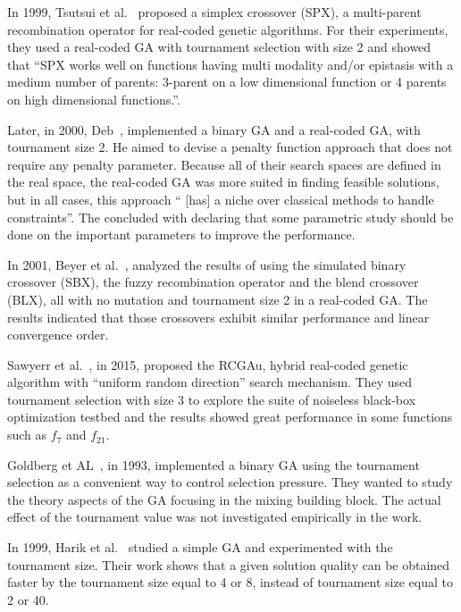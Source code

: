 In 1999, Tsutsui et al.~\cite{tsutsui1999multi} proposed a simplex crossover (SPX), a multi-parent recombination operator for real-coded genetic algorithms. For their experiments, they used a real-coded GA with tournament selection with size 2 and showed that ``SPX works well on functions having multi modality and/or epistasis with a medium number of parents: 3-parent on a low dimensional function or 4 parents on high dimensional functions.''. 

Later, in 2000, Deb~\cite{deb2000efficient}, implemented a binary GA and a real-coded GA, with tournament size 2. He aimed to devise a penalty function approach that does not require any penalty parameter. Because all of their search spaces are defined in the real space, the real-coded GA was more suited in finding feasible solutions, but in all cases, this approach `` [has] a niche over classical methods to handle constraints''. The concluded with declaring that some parametric study should be done on the important parameters to improve the performance.



In 2001, Beyer et al.~\cite{beyer2001self}, analyzed the results of using the simulated binary crossover (SBX), the fuzzy recombination operator and the blend crossover (BLX), all with no mutation and tournament size 2 in a real-coded GA. The results indicated that those crossovers exhibit similar performance and linear convergence order.


Sawyerr et al.~\cite{sawyerr2015benchmarking}, in 2015, proposed the RCGAu, hybrid real-coded genetic algorithm with ``uniform random direction'' search mechanism. They used tournament selection with size 3 to explore the suite of noiseless black-box optimization testbed and the results showed great performance in some functions such as $f_7$ and $f_{21}$.

Goldberg et AL~\cite{goldberg1993toward}, in 1993, implemented a binary GA using the tournament selection as a convenient way to control selection pressure. They wanted to study the theory aspects of the GA focusing in the mixing building block. The actual effect of the tournament value was not investigated empirically in the work.

In 1999, Harik et al.~\cite{harik1999compact} studied a simple GA and experimented with the tournament size. Their work shows that a given solution quality can be obtained faster by the tournament size equal to 4 or 8, instead of tournament size equal to 2 or 40. 

